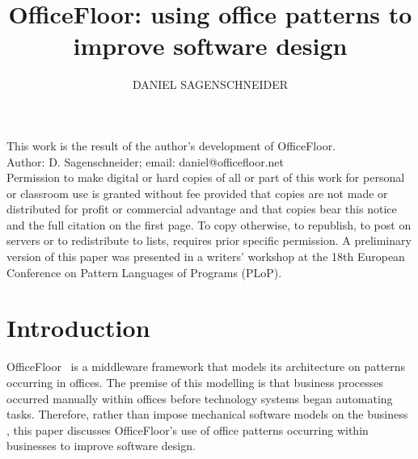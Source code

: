 \documentclass[prodmode]{style/acmlarge}
\title{OfficeFloor: using office patterns to improve software design}
\author{DANIEL SAGENSCHNEIDER \affil{OfficeFloor, daniel@officefloor.net}}
\begin{document}
\graphicspath{{./pdf/}}

\lstset{language=Java}

\captionsetup[lstlisting]{font=footnotesize}


\begin{bottomstuff}
This work is the result of the author's development of OfficeFloor.\\
Author: D. Sagenschneider; email: daniel@officefloor.net\\

Permission to make digital or hard copies of all or part of this work for
personal or classroom use is granted without fee provided that copies are not
made or distributed for profit or commercial advantage and that copies bear this
notice and the full citation on the first page. To copy otherwise, to republish,
to post on servers or to redistribute to lists, requires prior specific
permission. A preliminary version of this paper was presented in a writers'
workshop at the 18th European Conference on Pattern Languages of Programs
(PLoP).
\end{bottomstuff}

\maketitle


\section{Introduction}

OfficeFloor~\cite{officefloor} is a middleware framework that models its
architecture on patterns occurring in offices.  The premise of this modelling is
that business processes occurred manually within offices before technology
systems began automating tasks.  Therefore, rather than impose mechanical
software models on the business
\cite{enterprise-process-modelling,model-business-process,model-sociotechnical},
this paper discusses OfficeFloor's use of office patterns occurring within
businesses to improve software design.
\end{document}
